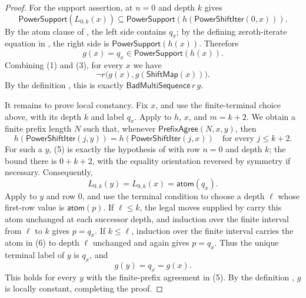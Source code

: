 \begin{proof}
For the support assertion,  at $n=0$ and
depth $k$ gives
\[
\mathsf{PowerSupport}(L_{0,k}(x))
 \subseteq \mathsf{PowerSupport}(h(\mathsf{PowerShiftIter}(0,x))).
\]
By the atom clause of , the left side contains $q_x$;
by the defining zeroth-iterate equation in , the
right side is $\mathsf{PowerSupport}(h(x))$.  Therefore
\[
g(x)=q_x\in\mathsf{PowerSupport}(h(x)). \tag{4}
\]
Combining (1) and (3), for every $x$ we have
\[
\neg r\bigl(g(x),g(\mathsf{ShiftMap}(x))\bigr).
\]
By the definition , this is exactly
$\mathsf{BadMultiSequence}\,r\,g$.

It remains to prove local constancy.  Fix $x$, and use the finite-terminal
choice above, with its depth $k$ and label $q_x$.  Apply
 to $h$, $x$, and $m=k+2$.  We obtain a
finite prefix length $N$ such that, whenever
$\mathsf{PrefixAgree}(N,x,y)$, then
\[
h(\mathsf{PowerShiftIter}(j,y))
 =h(\mathsf{PowerShiftIter}(j,x))
\quad\text{for every }j\leq k+2. \tag{5}
\]
For such a $y$, (5) is exactly the hypothesis of
 with row $n=0$ and depth $k$; the bound
there is $0+k+2$, with the equality orientation reversed by symmetry if
necessary.  Consequently,
\[
L_{0,k}(y)=L_{0,k}(x)=\mathsf{atom}(q_x). \tag{6}
\]
Apply  to $y$ and row $0$, and use the
terminal condition  to choose a depth $\ell$
whose first-row value is $\mathsf{atom}(p)$.  If $\ell\leq k$,
the legal moves supplied by  carry this
atom unchanged at each successor depth, and induction over the finite
interval from $\ell$ to $k$ gives $p=q_x$.  If
$k\leq\ell$, induction over the finite interval carries the atom in (6) to
depth $\ell$ unchanged and again gives $p=q_x$.  Thus the unique terminal
label of $y$ is $q_x$, and
\[
g(y)=q_x=g(x).
\]
This holds for every $y$ with the finite-prefix agreement in (5).  By the
definition , $g$ is locally constant, completing
the proof.
\end{proof}
